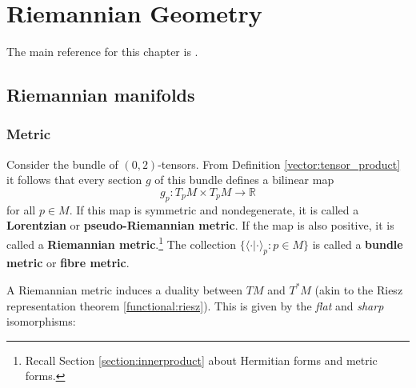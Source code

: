 \chapter{Riemannian Geometry}\label{chapter:riemann}

    The main reference for this chapter is \cite{petersen}.

\section{Riemannian manifolds}
\subsection{Metric}

    \begin{definition}
        Consider the bundle of $(0,2)$-tensors. From Definition \ref{vector:tensor_product} it follows that every section $g$ of this bundle defines a bilinear map \[g_p:T_pM\times T_pM\rightarrow\mathbb{R}\] for all $p\in M$. If this map is symmetric and nondegenerate, it is called a \textbf{Lorentzian} or \textbf{pseudo-Riemannian metric}. If the map is also positive, it is called a \textbf{Riemannian metric}.\footnote{Recall Section \ref{section:innerproduct} about Hermitian forms and metric forms.} The collection $\{\langle\cdot|\cdot\rangle_p:p\in M\}$ is called a \textbf{bundle metric} or \textbf{fibre metric}.
    \end{definition}

    A Riemannian metric induces a duality between $TM$ and $T^*M$ (akin to the Riesz representation theorem \ref{functional:riesz}). This is given by the \textit{flat} and \textit{sharp} isomorphisms:

